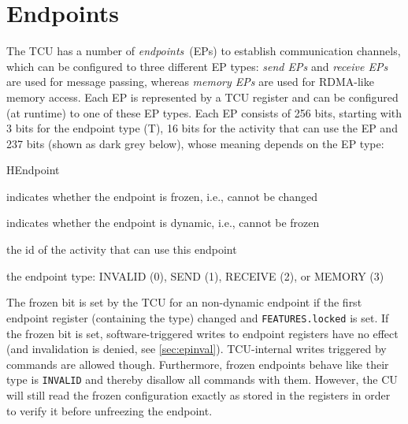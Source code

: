 \chapter{Endpoints}

The TCU has a number of \emph{endpoints}~(EPs) to establish communication channels, which can be
configured to three different EP types: \emph{send EPs} and \emph{receive EPs} are used for message
passing, whereas \emph{memory EPs} are used for RDMA-like memory access. Each EP is represented by a
TCU register and can be configured (at runtime) to one of these EP types. Each EP consists of 256
bits, starting with 3 bits for the endpoint type (T), 16 bits for the activity that can use the EP and
237 bits (shown as dark grey below), whose meaning depends on the EP type:\\[.1em]

\begin{register}{H}{Endpoint}{}
  \regnewline%
  \regnewline%
  \regnewline%
  \regnewline%
  \begin{regdesc}\begin{reglist}
    \item[frozen] indicates whether the endpoint is frozen, i.e., cannot be changed
    \item[dynamic] indicates whether the endpoint is dynamic, i.e., cannot be frozen
    \item[act]  the id of the activity that can use this endpoint \extend{}
    \item[type] the endpoint type: INVALID (0), SEND (1), RECEIVE (2), or MEMORY (3)
  \end{reglist}\end{regdesc}
\end{register}

The frozen bit is set by the TCU for an non-dynamic endpoint if the first endpoint register
(containing the type) changed and \texttt{FEATURES.locked} is set. If the frozen bit is set,
software-triggered writes to endpoint registers have no effect (and invalidation is denied, see
\autoref{sec:epinval}). TCU-internal writes triggered by commands are allowed though. Furthermore,
frozen endpoints behave like their type is \texttt{INVALID} and thereby disallow all commands with
them. However, the CU will still read the frozen configuration exactly as stored in the registers in
order to verify it before unfreezing the endpoint.

